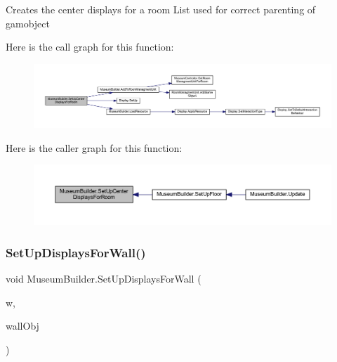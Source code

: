Creates the center displays for a room List used for correct parenting of gamobject 

Here is the call graph for this function\+:
\nopagebreak
\begin{figure}[H]
\begin{center}
\leavevmode
\includegraphics[width=350pt]{class_museum_builder_a159e037415aaf348d5a0af9561be8560_cgraph}
\end{center}
\end{figure}
Here is the caller graph for this function\+:
\nopagebreak
\begin{figure}[H]
\begin{center}
\leavevmode
\includegraphics[width=350pt]{class_museum_builder_a159e037415aaf348d5a0af9561be8560_icgraph}
\end{center}
\end{figure}
\mbox{\label{class_museum_builder_adbfb12c00a855fe0f816bc18a51a72e5}} 
\subsubsection{\texorpdfstring{Set\+Up\+Displays\+For\+Wall()}{SetUpDisplaysForWall()}}
{\footnotesize\ttfamily void Museum\+Builder.\+Set\+Up\+Displays\+For\+Wall (\begin{DoxyParamCaption}\item[{\mbox{\hyperlink{class_wall}{Wall}}}]{w,  }\item[{Game\+Object}]{wall\+Obj }\end{DoxyParamCaption})\hspace{0.3cm}{\ttfamily [private]}}




